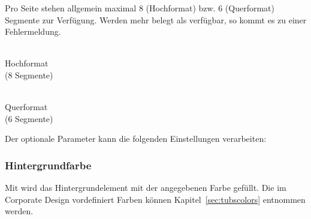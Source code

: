 \noindent\begin{minipage}{0.4\textwidth}
Pro Seite stehen allgemein maximal 8 (Hochformat) bzw. 6 (Querformat)
Segmente zur Verfügung. Werden mehr belegt als verfügbar,
so kommt es zu einer Fehlermeldung.
\end{minipage}
\begin{minipage}{0.6\textwidth}\centering
\begin{minipage}[b]{0.4\textwidth}\centering
{}\\
Hochformat\\ (8 Segmente)
\end{minipage}
\begin{minipage}[b]{0.45\textwidth}\centering
{}\\
Querformat\\ (6 Segmente)
\end{minipage}
\end{minipage}
\vspace*{0pt}

Der optionale Parameter  kann die folgenden Einstellungen verarbeiten:

\subsubsection{Hintergrundfarbe}

\vspace{-6mm}
\begin{Declaration}
\end{Declaration}

Mit  wird das Hintergrundelement mit der angegebenen
Farbe gefüllt. Die im Corporate Design vordefiniert Farben können
Kapitel~\ref{sec:tubscolors} entnommen werden.

